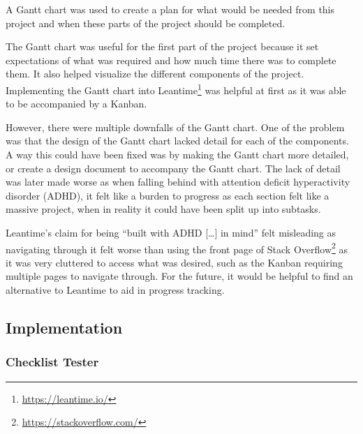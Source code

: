 \documentclass[../dissertation.tex]{subfiles}
\begin{document}
A Gantt chart was used to create a plan for what would be needed from this project
and when these parts of the project should be completed.

The Gantt chart was useful for the first part of the project because it set expectations
of what was required and how much time there was to complete them. It also helped
visualize the different components of the project. Implementing the Gantt chart into
Leantime\footnote{\url{https://leantime.io/}} was helpful at first as it was able to
be accompanied by a Kanban.

However, there were multiple downfalls of the Gantt chart. One of the problem was that
the design of the Gantt chart lacked detail for each of the components. A way this could
have been fixed was by making the Gantt chart more detailed, or create a design document
to accompany the Gantt chart. The lack of detail was later made worse as when falling behind
with attention deficit hyperactivity disorder (ADHD), it felt like a burden to progress
as each section felt like a massive project, when in reality it could have been split up
into subtasks.

Leantime's claim for being \enquote{built with ADHD [\ldots] in mind} felt misleading 
as navigating through it felt worse than using the front page of 
Stack Overflow\footnote{\url{https://stackoverflow.com/}} as it was very cluttered to access
what was desired, such as the Kanban requiring multiple pages to navigate through.
For the future, it would be helpful to find an alternative to Leantime to aid in
progress tracking. 

\subsection{Implementation}

\subsubsection{Checklist Tester}
\end{document}
